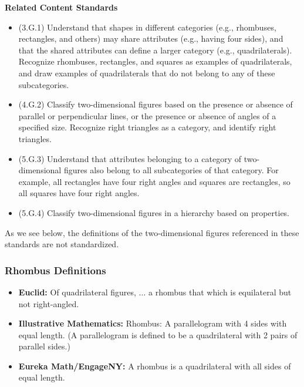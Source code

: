 \documentclass[
]{book}
\providecommand{\tightlist}{%
  \setlength{\itemsep}{0pt}\setlength{\parskip}{0pt}}
\newenvironment{standards}{}{}
\theoremstyle{definition}
\theoremstyle{definition}
\theoremstyle{definition}
\theoremstyle{definition}
\theoremstyle{remark}
\begin{document}
\begin{standards}

\begin{center}
\textbf{Related Content Standards}

\end{center}

\begin{itemize}
\tightlist
\item
  (3.G.1) Understand that shapes in different categories (e.g., rhombuses, rectangles, and others) may share attributes (e.g., having four sides), and that the shared attributes can define a larger category (e.g., quadrilaterals). Recognize rhombuses, rectangles, and squares as examples of quadrilaterals, and draw examples of quadrilaterals that do not belong to any of these subcategories.
\item
  (4.G.2) Classify two-dimensional figures based on the presence or absence of parallel or perpendicular lines, or the presence or absence of angles of a specified size. Recognize right triangles as a category, and identify right triangles.
\item
  (5.G.3) Understand that attributes belonging to a category of two-dimensional figures also belong to all subcategories of that category. For example, all rectangles have four right angles and squares are rectangles, so all squares have four right angles.
\item
  (5.G.4) Classify two-dimensional figures in a hierarchy based on properties.
\end{itemize}

\end{standards}

As we see below, the definitions of the two-dimensional figures referenced in these standards are not standardized.

\hypertarget{rhombus-definitions}{%
\subsubsection{Rhombus Definitions}\label{rhombus-definitions}}

\begin{itemize}
\tightlist
\item
  \textbf{Euclid:} Of quadrilateral figures, \(\ldots\) a rhombus that which is equilateral but not right-angled.
\item
  \textbf{Illustrative Mathematics:} Rhombus: A parallelogram with 4 sides with equal length. (A parallelogram is defined to be a quadrilateral with 2 pairs of parallel sides.)
\item
  \textbf{Eureka Math/EngageNY:} A rhombus is a quadrilateral with all sides of equal length.
\end{itemize}
\end{document}

